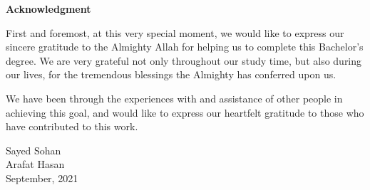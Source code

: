 \setcounter{page}{2}

\centering
\textbf{Acknowledgment}

\vspace{.5cm}

\justifying
\noindent
First and foremost, at this very special moment, we would like to express our sincere gratitude to the Almighty Allah for helping us to complete this Bachelor's degree. We are very grateful not only throughout our study time, but also during our lives, for the tremendous blessings the Almighty has conferred upon us.

\vspace{3mm}
\noindent
We have been through the experiences with and assistance of other people in achieving this goal, and would like to express our heartfelt gratitude to those who have contributed to this work.

\vspace{3cm}

\begin{flushright}
         Sayed Sohan\\
         Arafat Hasan\\
    September, 2021 


\end{flushright}


